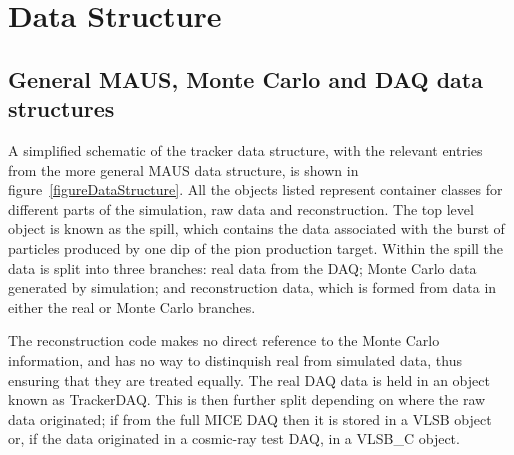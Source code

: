\section{Data Structure}
\label{sec:DataStructure}

\subsection{General MAUS, Monte Carlo and DAQ data structures}
\label{subsec:GeneralDataStructure}
A simplified schematic of the tracker data structure, with the relevant entries from the more general MAUS data structure, is shown in figure~\ref{figureDataStructure}.  All the objects listed represent container classes for different parts of the simulation, raw data and reconstruction.  The top level object is known as the spill, which contains the data associated with the burst of particles produced by one dip of the pion production target.  Within the spill the data is split into three branches: real data from the DAQ; Monte Carlo data generated by simulation; and reconstruction data, which is formed from data in either the real or Monte Carlo branches. 

The reconstruction code makes no direct reference to the Monte Carlo information, and has no way to distinquish real from simulated data, thus ensuring that they are treated equally.  The real DAQ data is held in an object known as TrackerDAQ.  This is then further split depending on where the raw data originated; if from the full MICE DAQ then it is stored in a VLSB object or, if the data originated in a cosmic-ray test DAQ, in a VLSB\_C object.

